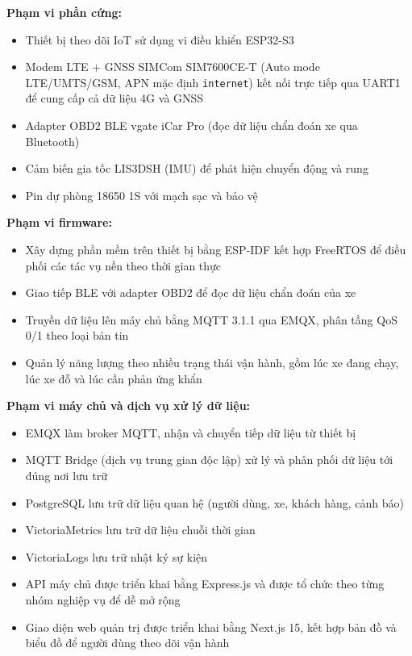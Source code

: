 \documentclass[a4paper]{extarticle}
\providecommand{\tightlist}{%
  \setlength{\itemsep}{0pt}\setlength{\parskip}{0pt}}
\begin{document}
\textbf{Phạm vi phần cứng:}

\begin{itemize}
\tightlist
\item
  Thiết bị theo dõi IoT sử dụng vi điều khiển ESP32-S3
\item
  Modem LTE + GNSS SIMCom SIM7600CE-T (Auto mode LTE/UMTS/GSM, APN mặc
  định \texttt{internet}) kết nối trực tiếp qua UART1 để cung cấp cả dữ
  liệu 4G và GNSS
\item
  Adapter OBD2 BLE vgate iCar Pro (đọc dữ liệu chẩn đoán xe qua
  Bluetooth)
\item
  Cảm biến gia tốc LIS3DSH (IMU) để phát hiện chuyển động và rung
\item
  Pin dự phòng 18650 1S với mạch sạc và bảo vệ
\end{itemize}

\textbf{Phạm vi firmware:}

\begin{itemize}
\tightlist
\item
  Xây dựng phần mềm trên thiết bị bằng ESP-IDF kết hợp FreeRTOS để điều
  phối các tác vụ nền theo thời gian thực
\item
  Giao tiếp BLE với adapter OBD2 để đọc dữ liệu chẩn đoán của xe
\item
  Truyền dữ liệu lên máy chủ bằng MQTT 3.1.1 qua EMQX, phân tầng QoS 0/1
  theo loại bản tin
\item
  Quản lý năng lượng theo nhiều trạng thái vận hành, gồm lúc xe đang
  chạy, lúc xe đỗ và lúc cần phản ứng khẩn
\end{itemize}

\textbf{Phạm vi máy chủ và dịch vụ xử lý dữ liệu:}

\begin{itemize}
\tightlist
\item
  EMQX làm broker MQTT, nhận và chuyển tiếp dữ liệu từ thiết bị
\item
  MQTT Bridge (dịch vụ trung gian độc lập) xử lý và phân phối dữ liệu tới
  đúng nơi lưu trữ
\item
  PostgreSQL lưu trữ dữ liệu quan hệ (người dùng, xe, khách hàng, cảnh
  báo)
\item
  VictoriaMetrics lưu trữ dữ liệu chuỗi thời gian
\item
  VictoriaLogs lưu trữ nhật ký sự kiện
\item
  API máy chủ được triển khai bằng Express.js và được tổ chức theo từng
  nhóm nghiệp vụ để dễ mở rộng
\item
  Giao diện web quản trị được triển khai bằng Next.js 15, kết hợp bản đồ
  và biểu đồ để người dùng theo dõi vận hành
\end{itemize}
\end{document}
